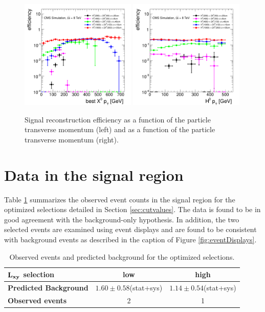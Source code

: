 \begin{figure}[htbp]
\includegraphics[width=0.49\textwidth]{plots/signal/effXPt.pdf}
\includegraphics[width=0.49\textwidth]{plots/signal/effHPt.pdf}
\caption{Signal reconstruction efficiency as a function of the \X particle transverse 
momentum (left) and as a function of the \Higgs particle transverse momentum (right).
\label{fig:effPt}}
\end{figure}


\section{Data in the signal region}
\label{sec:fullunblinding}

Table \ref{tab:fullunblinding} summarizes the observed event counts in the signal region for the optimized 
selections detailed in Section \ref{sec:cutvalues}. The data is found to be in good agreement with the 
background-only hypothesis. In addition, the two selected events are examined using event displays
and are found to be consistent with background events as described in the caption of 
Figure \ref{fig:eventDisplays}.  

\begin{table}[htbp]
\centering
\caption{Observed events and predicted background for the optimized selections.\label{tab:fullunblinding}}
\vspace{0.1cm}
\begin{tabular}{|l|c|c|}
\hline
$\bf L_{xy}$ \bf selection & \bf low & \bf high \\
\hline
\bf Predicted Background & $ 1.60\pm0.58$(stat+sys) & $ 1.14\pm0.54$(stat+sys) \\
\hline
\bf Observed events & 2 & 1 \\ 
\hline
\end{tabular}
\end{table}


